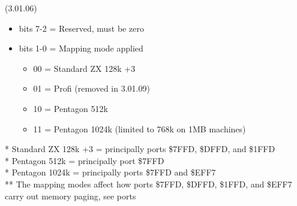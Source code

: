  (3.01.06)
\begin{itemize}
\item bits 7-2 = Reserved, must be zero
\item bits 1-0 = Mapping mode applied
  \begin{itemize}
  \item 00 = Standard ZX 128k +3
  \item 01 = Profi (removed in 3.01.09)
  \item 10 = Pentagon 512k
  \item 11 = Pentagon 1024k (limited to 768k on 1MB machines)
  \end{itemize}
\end{itemize}
* Standard ZX 128k +3 = principally ports \$7FFD, \$DFFD, and \$1FFD\\
* Pentagon 512k = principally port \$7FFD\\
* Pentagon 1024k = principally ports \$7FFD and \$EFF7\\
** The mapping modes affect how ports \$7FFD, \$DFFD, \$1FFD, and \$EFF7
carry out memory paging, see ports

